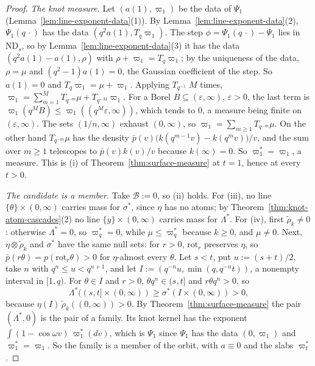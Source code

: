 \begin{proof}
\emph{The knot measure.} Let $(a(1), \varpi_1)$ be the data of $\Psi_1$
(Lemma~\ref{lem:line-exponent-data}(1)). By Lemma~\ref{lem:line-exponent-data}(2), $\Psi_1(q\,\cdot)$
has the data $(q^2a(1), T_q\varpi_1)$. The step $\phi = \Psi_1(q\,\cdot) - \Psi_1$ lies in
$\mathrm{ND}_s$, so by Lemma~\ref{lem:line-exponent-data}(3) it has the data
$(q^2a(1) - a(1), \rho)$ with $\rho + \varpi_1 = T_q\varpi_1$; by the uniqueness of the data,
$\rho = \mu$ and $(q^2 - 1)a(1) = 0$, the Gaussian coefficient of the step. So $a(1) = 0$ and
$T_q\varpi_1 = \mu + \varpi_1$. Applying $T_{q^{-1}}$ $M$ times,
$\varpi_1 = \sum_{m=1}^MT_{q^{-m}}\mu + T_{q^{-M}}\varpi_1$. For a Borel
$B \subseteq (\varepsilon,\infty)$, $\varepsilon > 0$, the last term is
$\varpi_1(q^MB) \le \varpi_1((q^M\varepsilon,\infty))$, which tends to $0$, a \Levy{} measure being
finite on $(\varepsilon,\infty)$. The sets $(1/n,\infty)$ exhaust $(0,\infty)$, so
$\varpi_1 = \sum_{m \ge 1}T_{q^{-m}}\mu$. On the other hand $T_{q^{-m}}\mu$ has the density
$\bar p(v)\bigl(k(q^{m-1}v) - k(q^mv)\bigr)/v$, and the sum over $m \ge 1$ telescopes to
$\bar p(v)k(v)/v$ because $k(\infty) = 0$. So $\varpi^*_1 = \varpi_1$, a \Levy{} measure. This is
(i) of Theorem~\ref{thm:surface-measure} at $t = 1$, hence at every $t > 0$.

\emph{The candidate is a member.} Take $\mathcal{B} := 0$, so (ii) holds. For (iii), no line
$\{\theta\} \times (0,\infty)$ carries mass for $\sigma^*$, since $\eta$ has no atoms; by
Theorem~\ref{thm:knot-atom-cascades}(2) no line $\{y\} \times (0,\infty)$ carries mass for
$\Lambda^*$. For (iv), first $\tilde\rho_k \ne 0$: otherwise $\Lambda^* = 0$, so $\varpi^*_q = 0$,
while $\mu \le \varpi^*_q$ because $k \ge 0$, and $\mu \ne 0$. Next, $\eta \otimes \tilde\rho_k$ and
$\sigma^*$ have the same null sets: for $r > 0$, $\mathrm{rot}_r$ preserves $\eta$, so
$\bar p(r\theta) = p(\mathrm{rot}_r\theta) > 0$ for $\eta$-almost every $\theta$. Let $s < t$, put
$u := (s + t)/2$, take $n$ with $q^n \le u < q^{n+1}$, and let
$I := (q^{-n}u, \min(q, q^{-n}t))$, a nonempty interval in $[1,q)$. For $\theta \in I$ and $r > 0$,
$\theta q^n \in (s,t]$ and $r\theta q^n > 0$, so
\[
  \Lambda^*((s,t] \times (0,\infty)) \ge \sigma^*(I \times (0,\infty)) > 0,
\]
because $\eta(I)\,\tilde\rho_k((0,\infty)) > 0$. By Theorem~\ref{thm:surface-measure} the pair
$(\Lambda^*, 0)$ is the pair of a family. Its knot kernel has the exponent
$\int(1 - \cos\omega v)\,\varpi^*_1(dv)$, which is $\Psi_1$ since $\Psi_1$ has the data
$(0, \varpi_1)$ and $\varpi^*_1 = \varpi_1$. So the family is a member of the orbit, with
$a \equiv 0$ and the slabs $\varpi^*_t$.


\end{proof}
